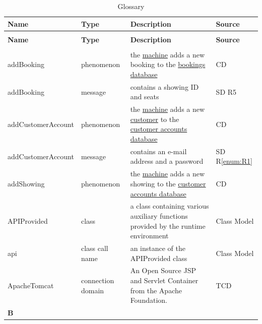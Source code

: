 \documentclass[a4paper,10pt,titlepage,bibtotoc,bibtotocnumbered]{scrreprt}
\begin{document}
\begin{longtable}{|p{4.75cm}|p{3cm}|p{5cm}|l|}
\caption{Glossary}
\label{table:glossar}\\
\hline
\rowcolor{black!25}\textbf{Name} & \textbf{Type} & \textbf{Description} & \textbf{Source}\\
\hline
\endfirsthead
\caption[]{Glossary}\\
\hline
\rowcolor{black!25}\textbf{Name} & \textbf{Type} & \textbf{Description} & \textbf{Source}\\
\endhead
\hline
\endfoot
\multicolumn{4}{|l|}{\textbf{A}}\\
\hline
\hypertarget{glossary:addBooking}{addBooking} & phenomenon & the \hyperlink{glossary:UDEKino}{machine} adds a new booking to the \hyperlink{glossary:Booking}{bookings database} & CD\\
\hline
addBooking & message & contains a showing ID and seats & SD R5\\
\hline
\hypertarget{glossary:addCustomerAccount}{addCustomerAccount} & phenomenon & the \hyperlink{glossary:UDEKino}{machine} adds a new \hyperlink{glossary:Customer}{customer} to the \hyperlink{glossary:CustomerAccount}{customer accounts database} & CD\\
\hline
addCustomerAccount & message & contains an e-mail address and a password & SD R\ref{enum:R1}\\
\hline
\hypertarget{glossary:addShowing}{addShowing} & phenomenon & the \hyperlink{glossary:UDEKino}{machine} adds a new showing to the \hyperlink{glossary:ShowingsDatabase}{customer accounts database} & CD\\
\hline
APIProvided & class & a class containing various auxiliary functions provided by the runtime environment & Class Model\\
\hline
api & class call name & an instance of the APIProvided class & Class Model\\
\hline
ApacheTomcat & connection domain & An Open Source JSP and Servlet Container from the Apache Foundation. & TCD\\
\hline
\multicolumn{4}{|l|}{\textbf{B}}\\
\hline

\end{longtable}
\end{document}
